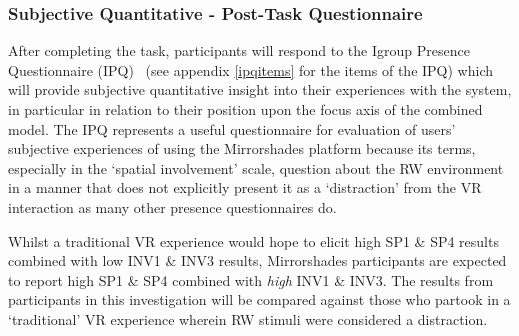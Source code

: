 \subsubsection{Subjective Quantitative - Post-Task Questionnaire}
After completing the task, participants will respond to the Igroup Presence Questionnaire (IPQ)~\cite{Schubert2001} (see appendix \ref{ipqitems} for the items of the IPQ) which will provide subjective quantitative insight into their experiences with the system, in particular in relation to their position upon the focus axis of the combined model. The IPQ represents a useful questionnaire for evaluation of users' subjective experiences of using the Mirrorshades platform because its terms, especially in the `spatial involvement' scale, question about the RW environment in a manner that does not explicitly present it as a `distraction' from the VR interaction as many other presence questionnaires do.


Whilst a traditional VR experience would hope to elicit high SP1 \& SP4 results combined with low INV1 \& INV3 results, Mirrorshades participants are expected to report high SP1 \& SP4 combined with \textit{high} INV1 \& INV3. The results from participants in this investigation will be compared against those who partook in a `traditional' VR experience wherein RW stimuli were considered a distraction.







